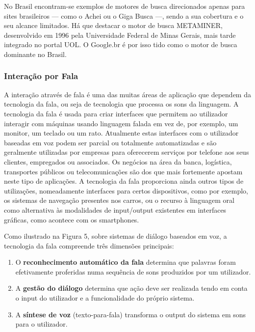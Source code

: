 \begin{multicols}{2}
No Brasil encontram-se exemplos de motores de busca direcionados apenas para sites brasileiros --- como o Achei \cite{achei} ou o Giga Busca \cite{busca} ---, 
sendo a sua cobertura e o seu alcance limitados. Há que destacar o motor de busca METAMINER, desenvolvido em 1996 pela Universidade Federal de Minas Gerais, 
mais tarde integrado no portal UOL. O Google.br é por isso tido como o motor de busca dominante no Brasil. 

  
\subsubsection{Interação por Fala}

A interação através de fala é uma das muitas áreas de aplicação que dependem da tecnologia da fala, ou seja de tecnologia que processa os sons da linguagem. 
A tecnologia da fala é usada para criar interfaces que permitem ao utilizador interagir com máquinas usando linguagem falada em vez de, por exemplo, um monitor, um teclado ou um rato. 
Atualmente estas interfaces com o utilizador baseadas em voz podem ser parcial ou totalmente automatizadas e são geralmente utilizadas por empresas para oferecerem serviços por telefone aos seus clientes, empregados ou associados. 
Os negócios na área da banca, logística, transportes públicos ou telecomunicações são dos que mais fortemente apostam neste tipo de aplicações. A tecnologia da fala proporciona ainda outros tipos de utilizações, 
nomeadamente interfaces para certos dispositivos, como por exemplo, os sistemas de navegação presentes nos carros, 
ou o recurso à linguagem oral como alternativa às mo\-da\-li\-da\-des de input/output existentes em interfaces gráficas, 
como acontece com os smartphones.



Como ilustrado na Figura 5, sobre sistemas de diálogo baseados em voz, a tecnologia da fala compreende três dimensões principais:

\begin{enumerate}
  \item O \textbf{reconhecimento automático da fala} determina que palavras foram efetivamente proferidas numa sequência de sons produzidos por um utilizador.
      \item A \textbf{gestão do diálogo} determina que ação deve ser realizada tendo em conta o input do utilizador e a funcionalidade do próprio sistema.
      \item A \textbf{síntese de voz} (texto-para-fala) transforma o output do sistema em sons para o utilizador.
\end{enumerate}



\end{multicols}

